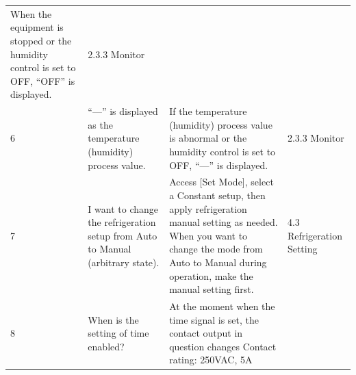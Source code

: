 \begin{longtable}[]{@{}|l|l|l|l|@{}}
\begin{minipage}[t]{0.33\columnwidth}
When the equipment is stopped or the humidity control is set to OFF,
``OFF'' is displayed.\strut
\end{minipage} & \begin{minipage}[t]{0.17\columnwidth}\raggedright
2.3.3 Monitor\strut
\end{minipage}\tabularnewline
 \begin{minipage}[t]{0.08\columnwidth}\raggedright
6\strut
\end{minipage} & \begin{minipage}[t]{0.30\columnwidth}\raggedright
``---'' is displayed as the temperature (humidity) process value.\strut
\end{minipage} & \begin{minipage}[t]{0.33\columnwidth}\raggedright
If the temperature (humidity) process value is abnormal or the humidity
control is set to OFF, ``---'' is displayed.\strut
\end{minipage} & \begin{minipage}[t]{0.17\columnwidth}\raggedright
2.3.3 Monitor\strut
\end{minipage}\tabularnewline
 \begin{minipage}[t]{0.08\columnwidth}\raggedright
7\strut
\end{minipage} & \begin{minipage}[t]{0.30\columnwidth}\raggedright
I want to change the refrigeration setup from Auto to Manual (arbitrary
state).\strut
\end{minipage} & \begin{minipage}[t]{0.33\columnwidth}\raggedright
Access {[}Set Mode{]}, select a Constant setup, then apply refrigeration
manual setting as needed. When you want to change the mode from Auto to
Manual during operation, make the manual setting first.\strut
\end{minipage} & \begin{minipage}[t]{0.17\columnwidth}\raggedright
4.3 Refrigeration Setting\strut
\end{minipage}\tabularnewline
 \begin{minipage}[t]{0.08\columnwidth}\raggedright
8\strut
\end{minipage} & \begin{minipage}[t]{0.30\columnwidth}\raggedright
When is the setting of time enabled?\strut
\end{minipage} & \begin{minipage}[t]{0.33\columnwidth}\raggedright
At the moment when the time signal is set, the contact output in
question changes Contact rating: 250VAC, 5A\strut

\end{minipage}
\end{longtable}
